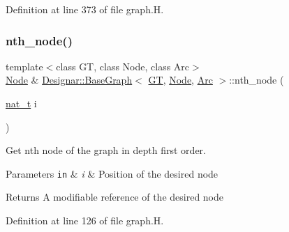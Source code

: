 Definition at line 373 of file graph.\+H.

\mbox{\label{class_designar_1_1_base_graph_ae4b7d560477f0b860d127a6ace6956e5}} 
\subsubsection{\texorpdfstring{nth\+\_\+node()}{nth\_node()}\hspace{0.1cm}{\footnotesize\ttfamily [1/2]}}
{\footnotesize\ttfamily template$<$class GT, class Node, class Arc$>$ \\
\hyperlink{namespace_designar_a5af326c65aa2bd26b26c410f2030d09e}{Node} \& \hyperlink{class_designar_1_1_base_graph}{Designar\+::\+Base\+Graph}$<$ \hyperlink{demo-buildgraph_8_c_a3001c40d2c31ca87ed96cd7d1334a55e}{GT}, \hyperlink{namespace_designar_a5af326c65aa2bd26b26c410f2030d09e}{Node}, \hyperlink{namespace_designar_a3f55fb5513d62ff47cbc8f72b8e95d6f}{Arc} $>$\+::nth\+\_\+node (\begin{DoxyParamCaption}\item[{\hyperlink{namespace_designar_aa72662848b9f4815e7bf31a7cf3e33d1}{nat\+\_\+t}}]{i }\end{DoxyParamCaption})\hspace{0.3cm}{\ttfamily [inline]}}



Get nth node of the graph in depth first order. 


\begin{DoxyParams}[1]{Parameters}
\mbox{\tt in}  & {\em i} & Position of the desired node \\
\hline
\end{DoxyParams}
\begin{DoxyReturn}{Returns}
A modifiable reference of the desired node 
\end{DoxyReturn}


Definition at line 126 of file graph.\+H.

\mbox{\label{class_designar_1_1_base_graph_adc03e916cb6246c9eeba181df82fd149}} 
